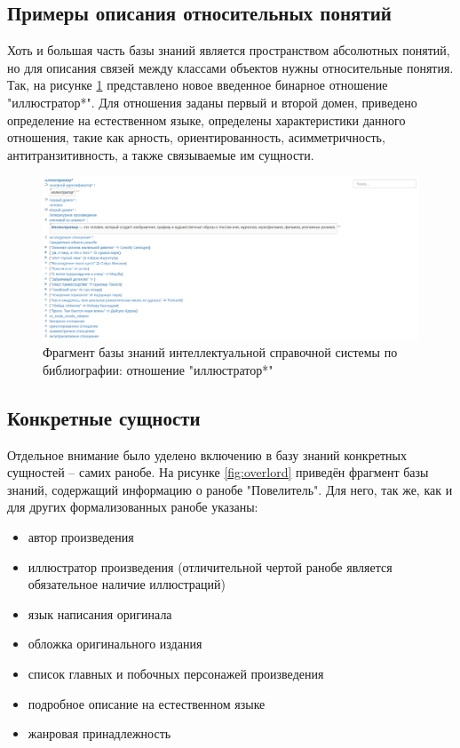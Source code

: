 \subsection{Примеры описания относительных понятий}

Хоть и большая часть базы знаний является пространством абсолютных понятий, но для описания связей между классами объектов нужны относительные понятия. Так, на рисунке \ref{fig:nrel_illustrator} представлено новое введенное бинарное отношение "иллюстратор*". Для отношения заданы первый и второй домен, приведено определение на естественном языке, определены характеристики данного отношения, такие как арность, ориентированность, асимметричность, антитранзитивность, а также связываемые им сущности.


\begin{figure}[H]
    \centering
    \includegraphics[scale=0.42]{imgs/nrel_illustrator.png}
    \caption{Фрагмент базы знаний интеллектуальной справочной системы по библиографии: отношение "иллюстратор*"}
    \label{fig:nrel_illustrator}
\end{figure}

\subsection{Конкретные сущности}

Отдельное внимание было уделено включению в базу знаний конкретных сущностей -- самих ранобе. На рисунке \ref{fig:overlord} приведён фрагмент базы знаний, содержащий информацию о ранобе "Повелитель". Для него, так же, как и для других формализованных ранобе указаны:
\begin{itemize}
    \item автор произведения
    \item иллюстратор произведения (отличительной чертой ранобе является обязательное наличие иллюстраций)
    \item язык написания оригинала
    \item обложка оригинального издания
    \item список главных и побочных персонажей произведения
    \item подробное описание на естественном языке
    \item жанровая принадлежность
\end{itemize}

